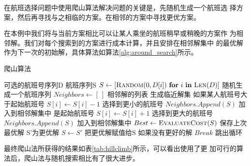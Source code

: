 \documentclass[fontset=fandol,a4paper,zihao=5]{ctexart}
\begin{document}
			在航班选择问题中使用爬山算法解决问题的关键是，先随机生成一个航班选
            择方案，然后再寻找与之相临的方案。在相邻的方案中寻找更优方案。
			
			在本例中我们将与当前方案相比可以让某人乘坐的航班稍早或稍晚的方案作
            为相邻解。我们对每个搜索到的方案进行成本计算，并且安排在相邻解集中
            的最优解作为下一次的初始解，具体算法如算法\ref{alg:around_search}所示。
            \begin{algorithm}
				\begin{algorithmic}
					\caption{\label{alg:around_search}爬山算法}
					\Require $\text{可选的航班号序列D}$
					\Ensure $\text{航班序列S}$
					\State $S \gets [ \Call{Random}{0,D[i]}\ \textbf{for}\ i\ \textbf{in}\ \Call{Len}{D}]$ \Comment 随机生成一个航班序列
						\State $Neighbors \gets [\ ]$ \Comment 相邻解的列表
						 \Comment 生成临近解集
							 \Comment 如果某人航班号大于起始航班号
								\State $S[i] \gets S[i] - 1$ \Comment 选择到更小的航班号
								\State $Neighbors.Append(S)$ \Comment 加入到相邻解集中
							\Else \Comment 是起始航班号
								\State $S[i] \gets S[i] + 1$ \Comment 选择到更大的航班号
								\State $Neighbors.Append(S)$ \Comment 加入到相邻解集中
							\EndIf
						\EndFor
						\State $Best \gets \Call{EvaluateCost}{S}$ \Comment 保存上次最优解
							 \Comment S'为更优解
								\State $S \gets S'$ \Comment 把更优解赋值给S
							\EndIf
						\EndFor
						 \Comment 如果没有更好的解
							\State $Break$ \Comment 跳出循环
						\EndIf
					\EndWhile
					\State {}
					\EndFunction
				\end{algorithmic}
            \end{algorithm}

			最终爬山法所获得的结果如表\ref{tab:hillclimb}所示，可以看出使用了更
            加可行的算法后，爬山法与随机搜索相比有了很大进步。
\end{document}
